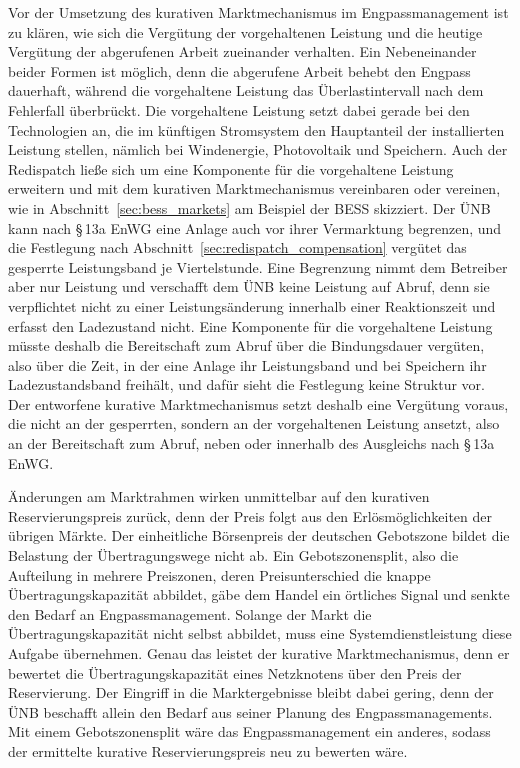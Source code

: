 Vor der Umsetzung des kurativen Marktmechanismus im Engpassmanagement ist zu klären, wie sich die Vergütung der vorgehaltenen Leistung und die heutige Vergütung der abgerufenen Arbeit zueinander verhalten.
Ein Nebeneinander beider Formen ist möglich, denn die abgerufene Arbeit behebt den Engpass dauerhaft, während die vorgehaltene Leistung das Überlastintervall nach dem Fehlerfall überbrückt.
Die vorgehaltene Leistung setzt dabei gerade bei den Technologien an, die im künftigen Stromsystem den Hauptanteil der installierten Leistung stellen, nämlich bei Windenergie, Photovoltaik und Speichern.
Auch der Redispatch ließe sich um eine Komponente für die vorgehaltene Leistung erweitern und mit dem kurativen Marktmechanismus vereinbaren oder vereinen, wie in Abschnitt~\ref{sec:bess_markets} am Beispiel der \ac{BESS} skizziert.
Der \ac{ÜNB} kann nach §\,13a \ac{EnWG} eine Anlage auch vor ihrer Vermarktung begrenzen, und die Festlegung nach Abschnitt~\ref{sec:redispatch_compensation} vergütet das gesperrte Leistungsband je Viertelstunde.
Eine Begrenzung nimmt dem Betreiber aber nur Leistung und verschafft dem \ac{ÜNB} keine Leistung auf Abruf, denn sie verpflichtet nicht zu einer Leistungsänderung innerhalb einer Reaktionszeit und erfasst den Ladezustand nicht.
Eine Komponente für die vorgehaltene Leistung müsste deshalb die Bereitschaft zum Abruf über die Bindungsdauer vergüten, also über die Zeit, in der eine Anlage ihr Leistungsband und bei Speichern ihr Ladezustandsband freihält, und dafür sieht die Festlegung keine Struktur vor.
Der entworfene kurative Marktmechanismus setzt deshalb eine Vergütung voraus, die nicht an der gesperrten, sondern an der vorgehaltenen Leistung ansetzt, also an der Bereitschaft zum Abruf, neben oder innerhalb des Ausgleichs nach §\,13a \ac{EnWG}.

Änderungen am Marktrahmen wirken unmittelbar auf den kurativen Reservierungspreis zurück, denn der Preis folgt aus den Erlösmöglichkeiten der übrigen Märkte.
Der einheitliche Börsenpreis der deutschen Gebotszone bildet die Belastung der Übertragungswege nicht ab.
Ein Gebotszonensplit, also die Aufteilung in mehrere Preiszonen, deren Preisunterschied die knappe Übertragungskapazität abbildet, gäbe dem Handel ein örtliches Signal und senkte den Bedarf an Engpassmanagement.
Solange der Markt die Übertragungskapazität nicht selbst abbildet, muss eine Systemdienstleistung diese Aufgabe übernehmen.
Genau das leistet der kurative Marktmechanismus, denn er bewertet die Übertragungskapazität eines Netzknotens über den Preis der Reservierung.
Der Eingriff in die Marktergebnisse bleibt dabei gering, denn der \ac{ÜNB} beschafft allein den Bedarf aus seiner Planung des Engpassmanagements.
Mit einem Gebotszonensplit wäre das Engpassmanagement ein anderes, sodass der ermittelte kurative Reservierungspreis neu zu bewerten wäre.

